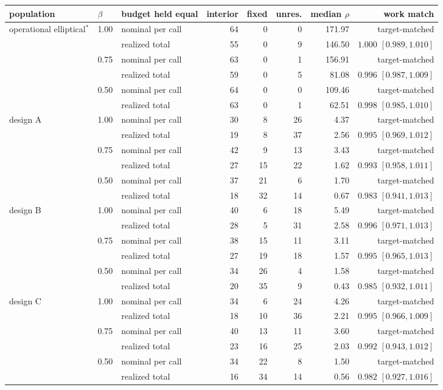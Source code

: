 \begin{tabular}{@{}l l l r r r r r@{}}
\toprule
population & $\beta$ & budget held equal & interior & fixed & unres. & median $\rho$ & work match \\
\midrule
operational elliptical$^{\ast}$ & 1.00 & nominal per call & 64 & 0 & 0 & 171.97 & target-matched \\
 & & realized total & 55 & 0 & 9 & 146.50 & $1.000$ $[0.989,1.010]$ \\
 & 0.75 & nominal per call & 63 & 0 & 1 & 156.91 & target-matched \\
 & & realized total & 59 & 0 & 5 & 81.08 & $0.996$ $[0.987,1.009]$ \\
 & 0.50 & nominal per call & 64 & 0 & 0 & 109.46 & target-matched \\
 & & realized total & 63 & 0 & 1 & 62.51 & $0.998$ $[0.985,1.010]$ \\
\midrule
design A & 1.00 & nominal per call & 30 & 8 & 26 & 4.37 & target-matched \\
 & & realized total & 19 & 8 & 37 & 2.56 & $0.995$ $[0.969,1.012]$ \\
 & 0.75 & nominal per call & 42 & 9 & 13 & 3.43 & target-matched \\
 & & realized total & 27 & 15 & 22 & 1.62 & $0.993$ $[0.958,1.011]$ \\
 & 0.50 & nominal per call & 37 & 21 & 6 & 1.70 & target-matched \\
 & & realized total & 18 & 32 & 14 & 0.67 & $0.983$ $[0.941,1.013]$ \\
\addlinespace
design B & 1.00 & nominal per call & 40 & 6 & 18 & 5.49 & target-matched \\
 & & realized total & 28 & 5 & 31 & 2.58 & $0.996$ $[0.971,1.013]$ \\
 & 0.75 & nominal per call & 38 & 15 & 11 & 3.11 & target-matched \\
 & & realized total & 27 & 19 & 18 & 1.57 & $0.995$ $[0.965,1.013]$ \\
 & 0.50 & nominal per call & 34 & 26 & 4 & 1.58 & target-matched \\
 & & realized total & 20 & 35 & 9 & 0.43 & $0.985$ $[0.932,1.011]$ \\
\addlinespace
design C & 1.00 & nominal per call & 34 & 6 & 24 & 4.26 & target-matched \\
 & & realized total & 18 & 10 & 36 & 2.21 & $0.995$ $[0.966,1.009]$ \\
 & 0.75 & nominal per call & 40 & 13 & 11 & 3.60 & target-matched \\
 & & realized total & 23 & 16 & 25 & 2.03 & $0.992$ $[0.943,1.012]$ \\
 & 0.50 & nominal per call & 34 & 22 & 8 & 1.50 & target-matched \\
 & & realized total & 16 & 34 & 14 & 0.56 & $0.982$ $[0.927,1.016]$ \\
\bottomrule
\end{tabular}
